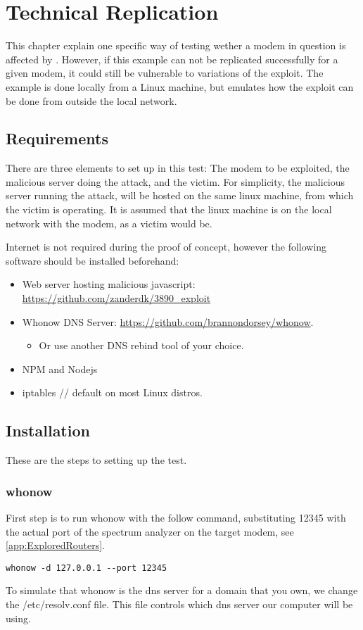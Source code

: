 \chapter{Technical Replication}
\label{app:technical_replication}
This chapter explain one specific way of testing wether a modem in question is affected by \exploitname{}.
However, if this example can not be replicated successfully for a given modem, it could still be vulnerable to variations of the exploit.
The example is done locally from a Linux machine, but emulates how the exploit can be done from outside the local network.

\section{Requirements}
There are three elements to set up in this test: The modem to be exploited, the malicious server doing the attack, and the victim.
For simplicity, the malicious server running the attack, will be hosted on the same linux machine, from which the victim is operating.
It is assumed that the linux machine is on the local network with the modem, as a victim would be.

Internet is not required during the proof of concept, however the following software should be installed beforehand:

\begin{itemize}
    \item Web server hosting malicious javascript: \url{https://github.com/zanderdk/3890_exploit}
    \item Whonow DNS Server: \url{https://github.com/brannondorsey/whonow}.
    \begin{itemize}
        \item Or use another DNS rebind tool of your choice.
    \end{itemize}
    \item NPM and Nodejs
    \item iptables // default on most Linux distros.
\end{itemize}

\section{Installation}
These are the steps to setting up the test.

\subsection{whonow}
First step is to run whonow with the follow command, substituting 12345 with the actual port of the spectrum analyzer on the target modem, see \cref{app:ExploredRouters}.
\begin{lstlisting}[numbers=none]
whonow -d 127.0.0.1 --port 12345
\end{lstlisting}
To simulate that whonow is the dns server for a domain that you own, we change the /etc/resolv.conf file. 
This file controls which dns server our computer will be using.

